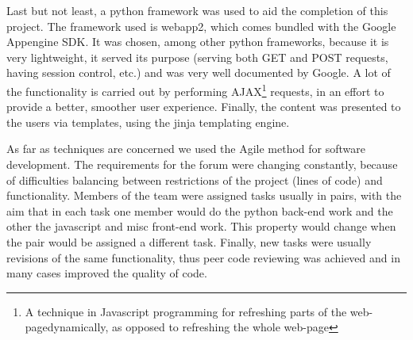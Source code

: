 \documentclass[12pt,a4paper,titlepage]{article}
\begin{document}
Last but not least, a python framework was used to aid the completion of this project. The framework used is webapp2, which comes bundled with the Google Appengine SDK. It was chosen, among other python frameworks, because it is very lightweight, it served its purpose (serving both GET and POST requests, having session control, etc.) and was very well documented by Google. A lot of the functionality is carried out by performing AJAX\footnote{A technique in Javascript programming for refreshing parts of the web-pagedynamically, as opposed to refreshing the whole web-page}  requests, in an effort to provide a better, smoother user experience. Finally, the content was presented to the users via templates, using the jinja templating engine.

As far as techniques are concerned we used the Agile method for software development. The requirements for the forum were changing constantly, because of difficulties balancing between restrictions of the project (lines of code) and functionality. Members of the team were assigned tasks usually in pairs, with the aim that in each task one member would do the python back-end work and the other the javascript and misc front-end work. This property would change when the pair would be assigned a different task. Finally, new tasks were usually revisions of the same functionality, thus peer code reviewing was achieved and in many cases improved the quality of code.
\end{document}
